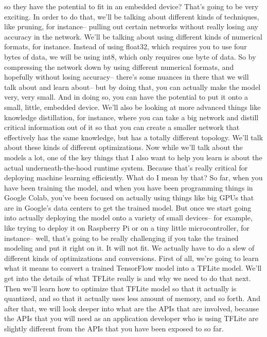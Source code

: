 so they have the potential to fit in an embedded device?
That's going to be very exciting.
In order to do that, we'll be talking about different kinds of techniques,
like pruning, for instance-- pulling out certain networks without really
losing any accuracy in the network.
We'll be talking about using different kinds of numerical formats,
for instance.
Instead of using float32, which requires you to use four bytes of data,
we will be using int8, which only requires one byte of data.
So by compressing the network down by using different numerical formats,
and hopefully without losing accuracy-- there's some nuances in there that we
will talk about and learn about--
but by doing that, you can actually make the model very, very small.
And in doing so, you can have the potential
to put it onto a small, little, embedded device.
We'll also be looking at more advanced things like knowledge distillation,
for instance, where you can take a big network
and distill critical information out of it so that you can create a smaller
network that effectively has the same knowledge,
but has a totally different topology.
We'll talk about these kinds of different optimizations.
Now while we'll talk about the models a lot,
one of the key things that I also want to help you learn
is about the actual underneath-the-hood runtime system.
Because that's really critical for deploying machine learning efficiently.
What do I mean by that?
So far, when you have been training the model,
and when you have been programming things in Google Colab,
you've been focused on actually using things
like big GPUs that are in Google's data centers to get the trained model.
But once we start going into actually deploying the model
onto a variety of small devices--
for example, like trying to deploy it on Raspberry Pi
or on a tiny little microcontroller, for instance-- well,
that's going to be really challenging if you take the trained modeling
and put it right on it.
It will not fit.
We actually have to do a slew of different kinds of optimizations
and conversions.
First of all, we're going to learn what it
means to convert a trained TensorFlow model into a TFLite model.
We'll get into the details of what TFLite really is
and why we need to do that next.
Then we'll learn how to optimize that TFLite model so that it actually
is quantized, and so that it actually uses less amount of memory,
and so forth.
And after that, we will look deeper into what
are the APIs that are involved, because the APIs that you will need
as an application developer who is using TFLite
are slightly different from the APIs that you have been exposed to so far.
